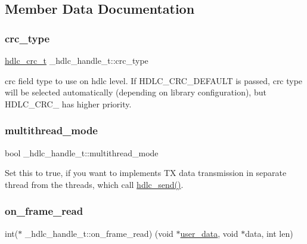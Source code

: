 \subsection{Member Data Documentation}
\mbox{\label{struct__hdlc__handle__t_a156f67a5da24e537a8c0dcda28b59668}} 
\subsubsection{\texorpdfstring{crc\+\_\+type}{crc\_type}}
{\footnotesize\ttfamily \hyperlink{group__HDLC__API_gabb73b32d08d8e79eefe9385634a74bf7}{hdlc\+\_\+crc\+\_\+t} \+\_\+hdlc\+\_\+handle\+\_\+t\+::crc\+\_\+type}

crc field type to use on hdlc level. If H\+D\+L\+C\+\_\+\+C\+R\+C\+\_\+\+D\+E\+F\+A\+U\+LT is passed, crc type will be selected automatically (depending on library configuration), but H\+D\+L\+C\+\_\+\+C\+R\+C\+\_ has higher priority. \mbox{\label{struct__hdlc__handle__t_aa70c56a76a3c4c5d9ccdee3b019bbce7}} 
\subsubsection{\texorpdfstring{multithread\+\_\+mode}{multithread\_mode}}
{\footnotesize\ttfamily bool \+\_\+hdlc\+\_\+handle\+\_\+t\+::multithread\+\_\+mode}

Set this to true, if you want to implements TX data transmission in separate thread from the threads, which call \hyperlink{group__HDLC__API_ga8b5cc456927145cebd82b2b560a6fa10}{hdlc\+\_\+send()}. \mbox{\label{struct__hdlc__handle__t_a751872adfef39b5b1325fa8826bae689}} 
\subsubsection{\texorpdfstring{on\+\_\+frame\+\_\+read}{on\_frame\_read}}
{\footnotesize\ttfamily int($\ast$ \+\_\+hdlc\+\_\+handle\+\_\+t\+::on\+\_\+frame\+\_\+read) (void $\ast$\hyperlink{struct__hdlc__handle__t_a41563ee7b01240a582d2f9ce9a632da8}{user\+\_\+data}, void $\ast$data, int len)}

